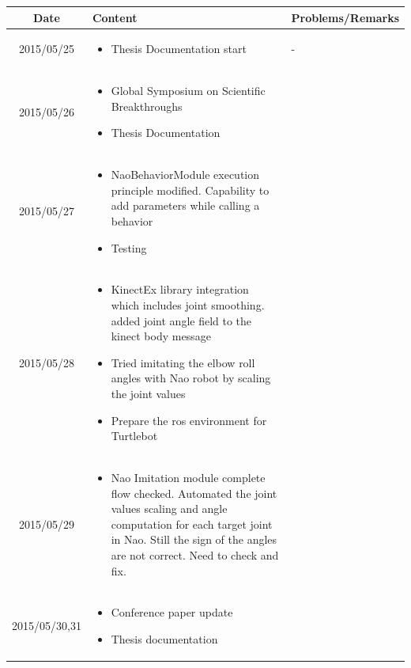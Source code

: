 \documentclass[11pt]{article} %
\begin{document}
\begin{center}
    \begin{longtable}{ | c | p{6cm} | p{5cm} |}
    \hline
    Date & Content & Problems/Remarks \\ 
    \endhead
    \hline    
     2015/05/25         & 
  \begin{itemize}
  \item Thesis Documentation start
\end{itemize}  
   & - \\
\hline
  										 
 2015/05/26         & 
  \begin{itemize}
  \item Global Symposium on Scientific Breakthroughs 
  \item Thesis Documentation
\end{itemize}   
& 
 \\
\hline
  										 
  
  2015/05/27        & 
  \begin{itemize}
  \item NaoBehaviorModule execution principle modified. Capability to add parameters while calling a behavior
  \item Testing
  \end{itemize}   
  										 & 
 
  										 \\
  \hline
  
  2015/05/28         & 
  \begin{itemize}
  \item KinectEx library integration which includes joint smoothing. added joint angle field to the kinect body message
  \item Tried imitating the elbow roll angles with Nao robot by scaling the joint values
  \item Prepare the ros environment for Turtlebot
  \end{itemize}
  & 
\\  										 \hline

  2015/05/29         & 
  \begin{itemize}
  \item Nao Imitation module complete flow checked. Automated the joint values scaling and angle computation for each target joint in Nao. Still the sign of the angles are not correct. Need to check and fix.
\end{itemize}   
  & 
\\
  										 \hline
  										 
  2015/05/30,31         & 
  \begin{itemize}
  \item Conference paper update
  \item Thesis documentation
\end{itemize}   
  & 
\\
  										 \hline										 
  										   								 
    \end{longtable}
\end{center}
\end{document}
